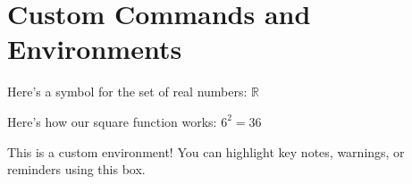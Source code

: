 \documentclass{article}
\newcommand{\R}{\mathbb{R}}       %
\newcommand{\sq}[1]{#1^2}         %
\newenvironment{important}{
  \begin{tcolorbox}[colback=green!10, colframe=blue!70!black, title=Important]
}{
  \end{tcolorbox}
}
\begin{document}
\section*{Custom Commands and Environments}

Here's a symbol for the set of real numbers: $\R$

Here's how our square function works: $\sq{6} = 36$

\begin{important}
This is a custom environment!  
You can highlight key notes, warnings, or reminders using this box.
\end{important}
\end{document}
